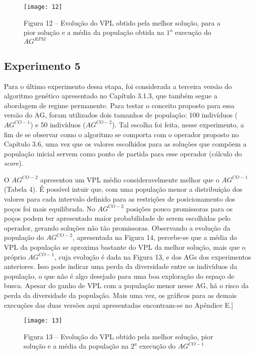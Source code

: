 \begin{figure}[H]
\centering

\texttt{[image: 12]}

\caption{Figura 12  – Evolução do VPL obtido pela melhor solução, para a pior solução e a média da população obtida na $1^a$ execução do $AG^{RPM}$}

\end{figure}

\subsection{Experimento 5}

Para o último experimento dessa etapa, foi considerada a terceira versão do algoritmo genético apresentado no Capítulo 3.1.3, que também segue a abordagem de regime permanente. Para testar o conceito proposto para essa versão do AG, foram utilizados dois tamanhos de população: 100 indivíduos ($AG^{CO-1}$) e 50 indivíduos ($AG^{CO-2}$). Tal escolha foi feita, nesse experimento, a fim de se observar como o algoritmo se comporta com o operador proposto no Capítulo 3.6, uma vez que os valores escolhidos para as soluções que compõem a população inicial servem como ponto de partida para esse operador (cálculo do \textit{score}).

O $AG^{CO-2}$ apresentou um VPL médio consideravelmente melhor que o $AG^{CO-1}$ (Tabela 4). É possível intuir que, com uma população menor a distribuição dos valores para cada intervalo definido para as restrições de posicionamento dos poços foi mais equilibrada. No $AG^{CO-2}$ posições pouco promissoras para os poços podem ter apresentado maior probabilidade de serem escolhidas pelo operador, gerando soluções não tão promissoras. Observando a evolução da população do $AG^{CO-2}$, apresentada na Figura 14, percebe-se que a média do VPL da população se aproxima bastante do VPL da melhor solução, mais que o próprio $AG^{CO-1}$, cuja evolução é dada na Figura 13, e dos AGs dos experimentos anteriores. Isso pode indicar uma perda da diversidade entre os indivíduos da população, o que não é algo desejado para uma boa exploração do espaço de busca. Apesar do ganho de VPL com a população menor nesse AG, há o risco da perda da diversidade da população. Mais uma vez, os gráficos para as demais execuções das duas versões aqui apresentadas encontram-se no Apêndice E.]

\begin{figure}[H]
\centering

\texttt{[image: 13]}

\caption{Figura 13  – Evolução do VPL obtido pela melhor solução, pior solução e a média da população na $2^a$ execução do $AG^{CO-1}$}

\end{figure}

